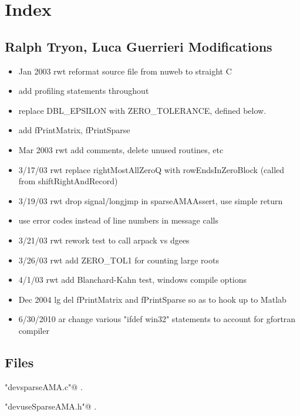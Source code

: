 \documentclass[12pt]{article}
\begin{document}
\section{Index}
\label{sec:index}

\subsection{Ralph Tryon, Luca Guerrieri Modifications}
\label{sec:ralph-tryon-modif}

\begin{itemize}
\item  Jan 2003 	rwt reformat source file from nuweb to straight C
\item  add profiling statements throughout
\item replace DBL\_EPSILON with ZERO\_TOLERANCE, defined below.
\item   add fPrintMatrix, fPrintSparse      
\item  Mar 2003 	rwt add comments, delete unused routines, etc 
\item  3/17/03		rwt replace rightMostAllZeroQ with rowEndsInZeroBlock               (called from shiftRightAndRecord) 
\item  3/19/03     rwt drop signal/longjmp in sparseAMAAssert, use simple return  
\item  use error codes instead of line numbers in message calls   
\item  3/21/03		rwt rework test to call arpack vs dgees    
\item  3/26/03     rwt add ZERO\_TOL1 for counting large roots      
\item  4/1/03	 rwt add Blanchard-Kahn test, windows compile options  
\item  Dec 2004	lg	del fPrintMatrix and fPrintSparse so as to hook up to Matlab
\item  6/30/2010	ar 	change various "ifdef win32" statements to account for gfortran compiler 
\end{itemize}

\subsection{Files}
\label{sec:files}




{\small\begin{list}{}{\setlength{\itemsep}{-\parsep}\setlength{\itemindent}{-\leftmargin}}
\item \verb@"devsparseAMA.c"@ {\footnotesize {\NWtxtDefBy} .
}
\item \verb@"devuseSparseAMA.h"@ {\footnotesize {\NWtxtDefBy} .}
\end{list}}
\end{document}
